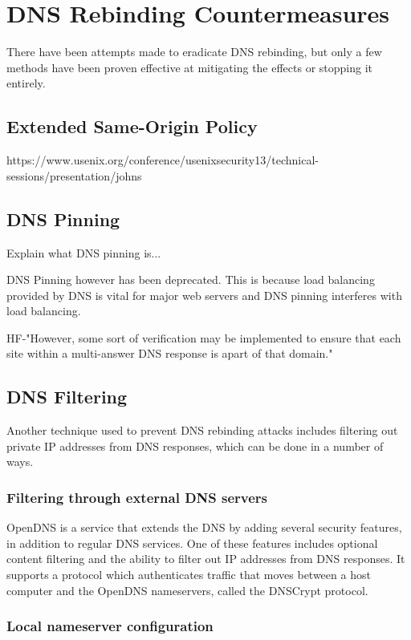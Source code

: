 \chapter{DNS Rebinding Countermeasures}

There have been attempts made to eradicate DNS rebinding, but only
a few methods have been proven effective at mitigating the effects
or stopping it entirely.

\section{Extended Same-Origin Policy}

https://www.usenix.org/conference/usenixsecurity13/technical-sessions/presentation/johns

\section{DNS Pinning}

Explain what DNS pinning is...

DNS Pinning however has been deprecated. This is because load balancing
provided by DNS is vital for major web servers and DNS pinning
interferes with load balancing.

HF-"However, some sort of verification may be implemented to ensure that each site within a multi-answer DNS response is apart of that domain."

\section{DNS Filtering}

Another technique used to prevent DNS rebinding attacks includes
filtering out private IP addresses from DNS responses, which can be
done in a number of ways.

\subsection{Filtering through external DNS servers}

OpenDNS is a service that extends the DNS by adding several security
features, in addition to regular DNS services. One of these features
includes optional content filtering and the ability to filter out
IP addresses from DNS responses. It supports a protocol which
authenticates traffic that moves between a host computer and the
OpenDNS nameservers, called the DNSCrypt protocol.

\subsection{Local nameserver configuration}

